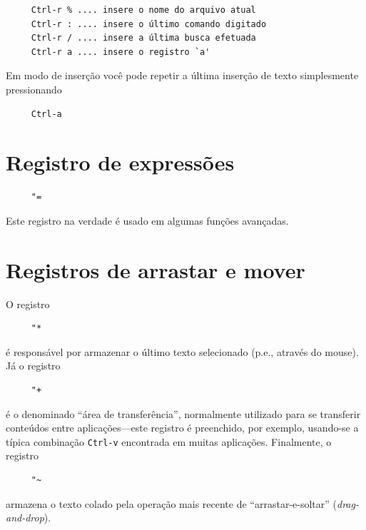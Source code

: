 \documentclass[10pt,a4paper,openany]{book}
\begin{document}
\begin{verbatim}
     Ctrl-r % .... insere o nome do arquivo atual
     Ctrl-r : .... insere o último comando digitado
     Ctrl-r / .... insere a última busca efetuada
     Ctrl-r a .... insere o registro `a'
\end{verbatim}

Em modo de inserção você pode repetir a última inserção de texto
simplesmente pressionando

\begin{verbatim}
     Ctrl-a
\end{verbatim}

\section{Registro de expressões}
\label{Registro de expressões}

\begin{verbatim}
     "=
\end{verbatim}

Este registro na verdade é usado em algumas funções avançadas.

\section{Registros de arrastar e mover}
\label{Registros de arrastar e mover}

O registro 
\begin{verbatim}
     "*
\end{verbatim}
 é responsável por armazenar o último texto selecionado (p.e., através do
mouse). Já o registro 
\begin{verbatim}
     "+
\end{verbatim}
é o denominado ``área de transferência'', normalmente utilizado para se
transferir conteúdos entre aplicações---este registro é preenchido, por
exemplo, usando-se a típica combinação {\tt Ctrl-v} encontrada em muitas
aplicações. Finalmente, o registro 
\begin{verbatim}
     "~
\end{verbatim}
armazena o texto colado pela operação mais recente de ``arrastar-e-soltar''
({\em drag-and-drop}). 

\end{document}
